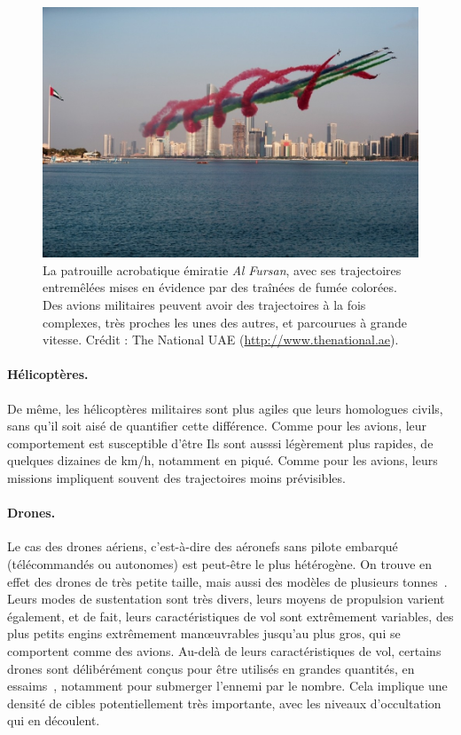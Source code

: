 	\begin{figure}[H]
		\centering
		\includegraphics[width=\textwidth]{figures/AlFursan}
		\caption{La patrouille acrobatique émiratie \emph{Al Fursan}, avec ses trajectoires entremêlées mises en évidence par des traînées de fumée colorées. Des avions militaires peuvent avoir des trajectoires à la fois complexes, très proches les unes des autres, et parcourues à grande vitesse. Crédit : The National UAE (\url{http://www.thenational.ae}).}
		\label{fig:alfursan}
	\end{figure}
	
	\paragraph{Hélicoptères.}
	De même, les hélicoptères militaires sont plus agiles que leurs homologues civils, sans qu'il soit aisé de quantifier cette différence. Comme pour les avions, leur comportement est susceptible d'être  Ils sont ausssi légèrement plus rapides, de quelques dizaines de km/h, notamment en piqué. Comme pour les avions, leurs missions impliquent souvent des trajectoires moins prévisibles.
	
	\paragraph{Drones.}
	Le cas des drones aériens, c'est-à-dire des aéronefs sans pilote embarqué (télécommandés ou autonomes) est peut-être le plus hétérogène. On trouve en effet des drones de très petite taille, mais aussi des modèles de plusieurs tonnes~\cite{reaper}. Leurs modes de sustentation sont très divers, leurs moyens de propulsion varient également, et de fait, leurs caractéristiques de vol sont extrêmement variables, des plus petits engins extrêmement manœuvrables jusqu'au plus gros, qui se comportent comme des avions. Au-delà de leurs caractéristiques de vol, certains drones sont délibérément conçus pour être utilisés en grandes quantités, en essaims~\cite{locust, alonso2016distributed, saska2014autonomous}, notamment pour submerger l'ennemi par le nombre. Cela implique une densité de cibles potentiellement très importante, avec les niveaux d'occultation qui en découlent.
	
